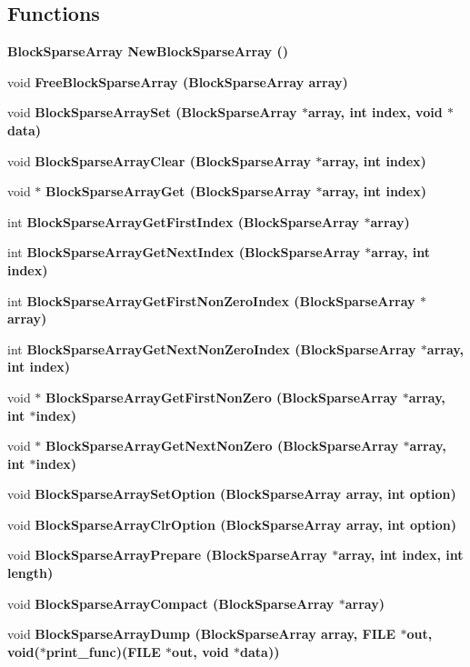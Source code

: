 \subsection*{Functions}
\begin{CompactItemize}
\item 
\bf{Block\-Sparse\-Array} \bf{New\-Block\-Sparse\-Array} ()
\item 
void \bf{Free\-Block\-Sparse\-Array} (\bf{Block\-Sparse\-Array} array)
\item 
void \bf{Block\-Sparse\-Array\-Set} (\bf{Block\-Sparse\-Array} $\ast$array, int index, void $\ast$data)
\item 
void \bf{Block\-Sparse\-Array\-Clear} (\bf{Block\-Sparse\-Array} $\ast$array, int index)
\item 
void $\ast$ \bf{Block\-Sparse\-Array\-Get} (\bf{Block\-Sparse\-Array} $\ast$array, int index)
\item 
int \bf{Block\-Sparse\-Array\-Get\-First\-Index} (\bf{Block\-Sparse\-Array} $\ast$array)
\item 
int \bf{Block\-Sparse\-Array\-Get\-Next\-Index} (\bf{Block\-Sparse\-Array} $\ast$array, int index)
\item 
int \bf{Block\-Sparse\-Array\-Get\-First\-Non\-Zero\-Index} (\bf{Block\-Sparse\-Array} $\ast$array)
\item 
int \bf{Block\-Sparse\-Array\-Get\-Next\-Non\-Zero\-Index} (\bf{Block\-Sparse\-Array} $\ast$array, int index)
\item 
void $\ast$ \bf{Block\-Sparse\-Array\-Get\-First\-Non\-Zero} (\bf{Block\-Sparse\-Array} $\ast$array, int $\ast$index)
\item 
void $\ast$ \bf{Block\-Sparse\-Array\-Get\-Next\-Non\-Zero} (\bf{Block\-Sparse\-Array} $\ast$array, int $\ast$index)
\item 
void \bf{Block\-Sparse\-Array\-Set\-Option} (\bf{Block\-Sparse\-Array} array, int option)
\item 
void \bf{Block\-Sparse\-Array\-Clr\-Option} (\bf{Block\-Sparse\-Array} array, int option)
\item 
void \bf{Block\-Sparse\-Array\-Prepare} (\bf{Block\-Sparse\-Array} $\ast$array, int index, int length)
\item 
void \bf{Block\-Sparse\-Array\-Compact} (\bf{Block\-Sparse\-Array} $\ast$array)
\item 
void \bf{Block\-Sparse\-Array\-Dump} (\bf{Block\-Sparse\-Array} array, FILE $\ast$out, void($\ast$print\_\-func)(FILE $\ast$out, void $\ast$data))
\end{CompactItemize}


